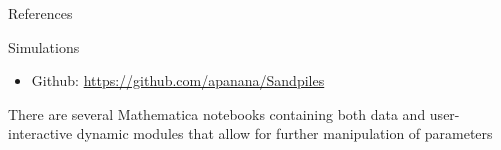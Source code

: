 \documentclass[final]{beamer}
\newlength{\onecolwid}
\begin{document}
\begin{frame}[t]
\begin{columns}[t]
\begin{column}{\onecolwid}
\begin{block}{References}

\nocite{*} %
\small{
\vspace{0.75in}}

\end{block}




\begin{alertblock}{Simulations}

\begin{itemize}
\item Github: \href{https://github.com/apanana/Sandpiles}{https://github.com/apanana/Sandpiles}
\end{itemize}

There are several Mathematica notebooks containing both data and user-interactive dynamic modules that allow for further manipulation of parameters
\end{alertblock}


\end{column} %

\end{columns} %

\end{frame} %
\end{document}
